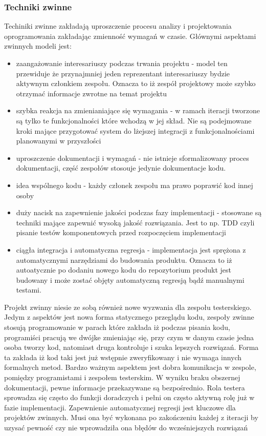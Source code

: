 \subsubsection{Techniki zwinne}
Techiniki zwinne zakładają uproszczenie procesu analizy i projektowania oprogramowania zakładając zmienność wymagań w czasie. Głównymi aspektami zwinnych modeli jest:
\begin{itemize}
  \item zaangażowanie interesariuszy podczas trwania projektu - model ten przewiduje że przynajmniej jeden reprezentant interesariuszy bydzie aktywnym członkiem zespołu. Oznacza to iż zespół projektowy może szybko otrzymać informacje zwrotne na temat projektu
  \item szybka reakcja na zmienianiające się wymagania - w ramach iteracji tworzone są tylko te funkcjonalności które wchodzą w jej skład. Nie są podejmowane kroki mające przygotować system do lżejszej integracji z funkcjonalnościami planowanymi w przyszłości 
  \item uproszczenie dokumentacji i wymagań - nie istnieje sformalizowany proces dokumentacji, część zespołów stosouje jedynie dokumentacje kodu.
  \item idea wspólnego kodu - każdy członek zespołu ma prawo poprawić kod innej osoby
  \item duży nacisk na zapewnienie jakości podczas fazy implementacji - stosowane są techniki mające zapewnić wysoką jakość rozwiązania. Jest to np. TDD czyli pisanie testów komponentowych przed rozpoczęciem implementacji
  \item ciągła integracja i automatyczna regresja - implementacja jest sprężona z automatycznymi narzędziami do budowania produktu. Oznacza to iż autoatycznie po dodaniu nowego kodu do repozytorium produkt jest budowany i może zostać objęty automatyczną regresją bądź manualnymi testami.
\end{itemize}
Projekt zwinny niesie ze sobą również nowe wyzwania dla zespołu testerskiego. Jedym z aspektów jest nowa forma statycznego przeglądu kodu, zespoły zwinne stosują programowanie w parach które zakłada iż podczas pisania kodu, programiści pracują we dwójke zmieniając się, przy czym w danym czasie jedna osoba tworzy kod, natomiast druga kontroluje i szuka lepszych rozwiązań. Forma ta zakłada iż kod taki jest już wstępnie zweryfikowany i nie wymaga innych formalnych metod. 
Bardzo ważnym aspektem jest dobra komunikacja w zespole, pomiędzy programistami i zespołem testerskim. W wyniku braku obszernej dokumentacji, pewne informacje przekazywane są bezpośrednio. Rola testera sprowadza się często do funkcji doradczych i pełni on często aktywną rolę już w fazie implementacji.
Zapewnienie automatycznej regresji jest kluczowe dla projektów zwinnych. Musi ona być wykonana po zakończeniu każdej z iteracji by uzysać pewność czy nie wprowadziła ona błędów do wcześniejszych rozwiązań
